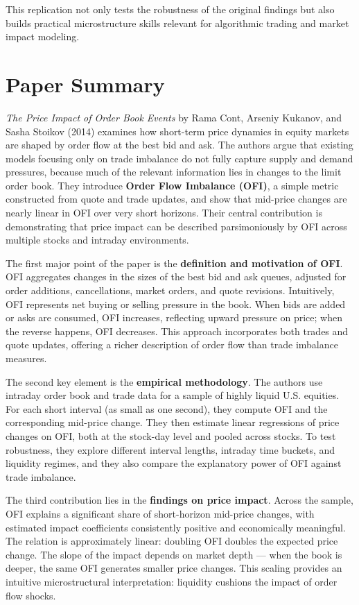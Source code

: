 \documentclass{article}
\begin{document}
This replication not only tests the robustness of the original findings
but also builds practical microstructure skills relevant for algorithmic
trading and market impact modeling.

\section{Paper Summary}\label{paper-summary}

\emph{The Price Impact of Order Book Events} by Rama Cont, Arseniy
Kukanov, and Sasha Stoikov (2014) examines how short-term price dynamics
in equity markets are shaped by order flow at the best bid and ask. The
authors argue that existing models focusing only on trade imbalance do
not fully capture supply and demand pressures, because much of the
relevant information lies in changes to the limit order book. They
introduce \textbf{Order Flow Imbalance (OFI)}, a simple metric
constructed from quote and trade updates, and show that mid-price
changes are nearly linear in OFI over very short horizons. Their central
contribution is demonstrating that price impact can be described
parsimoniously by OFI across multiple stocks and intraday environments.

The first major point of the paper is the \textbf{definition and
motivation of OFI}. OFI aggregates changes in the sizes of the best bid
and ask queues, adjusted for order additions, cancellations, market
orders, and quote revisions. Intuitively, OFI represents net buying or
selling pressure in the book. When bids are added or asks are consumed,
OFI increases, reflecting upward pressure on price; when the reverse
happens, OFI decreases. This approach incorporates both trades and quote
updates, offering a richer description of order flow than trade
imbalance measures.

The second key element is the \textbf{empirical methodology}. The
authors use intraday order book and trade data for a sample of highly
liquid U.S. equities. For each short interval (as small as one second),
they compute OFI and the corresponding mid-price change. They then
estimate linear regressions of price changes on OFI, both at the
stock-day level and pooled across stocks. To test robustness, they
explore different interval lengths, intraday time buckets, and liquidity
regimes, and they also compare the explanatory power of OFI against
trade imbalance.

The third contribution lies in the \textbf{findings on price impact}.
Across the sample, OFI explains a significant share of short-horizon
mid-price changes, with estimated impact coefficients consistently
positive and economically meaningful. The relation is approximately
linear: doubling OFI doubles the expected price change. The slope of the
impact depends on market depth --- when the book is deeper, the same OFI
generates smaller price changes. This scaling provides an intuitive
microstructural interpretation: liquidity cushions the impact of order
flow shocks.
\end{document}
